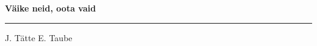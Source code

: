 \documentclass[10pt]{book}
\begin{document}
{
  \samepage
  \raggedbottom
  \raggedright
  \sloppy


  \vspace{0.2in}

  \noindent\begin{minipage}{.1\textwidth}
    \hfill\vspace{0.1in}
  \end{minipage}%
  \noindent\begin{minipage}{.8\textwidth}
    \centering
    \bfseries
    \large V\"aike neid, oota vaid
  \end{minipage}%
  \noindent\begin{minipage}{.1\textwidth}
      \hfill\vspace{0.1in}
  \end{minipage}

  \nopagebreak[4]
  \vspace{0.1in}
  \nopagebreak[4]
  \hrule height 0.05ex
  \nopagebreak[4]
  \vspace{-0.05in}

  {\footnotesize J. T\"atte \hfill E. Taube }\\
  \vspace{0.01in}



}
\end{document}
